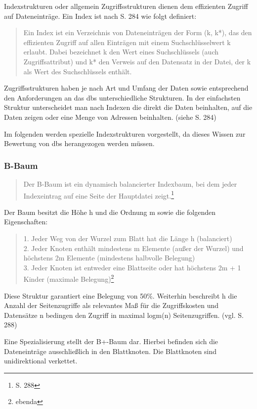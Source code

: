 Indexstrukturen oder allgemein Zugriffsstrukturen dienen dem effizienten Zugriff auf Dateneinträge.
Ein Index ist nach \cite{book:kudrass} S. 284 wie folgt definiert:
\begin{quote}
Ein Index ist ein Verzeichnis von Dateneinträgen der Form (k, k*), das den effizienten Zugriff auf allen Einträgen mit einem Suchschlüsselwert k erlaubt. Dabei bezeichnet k den Wert eines Suchschlüssels (auch Zugriffsattribut) und k* den Verweis auf den Datensatz in der Datei, der k als Wert des Suchschlüssels enthält.
\end{quote}
Zugriffsstrukturen haben je nach Art und Umfang der Daten sowie entsprechend den Anforderungen an das \Gls{dbs} unterschiedliche Strukturen.
In der einfachsten Struktur unterscheidet man nach Indexen die direkt die Daten beinhalten, auf die Daten zeigen oder eine Menge von Adressen beinhalten. (siehe \cite{book:kudrass} S. 284)

Im folgenden werden spezielle Indexstrukturen vorgestellt, da dieses Wissen zur Bewertung von \Gls{dbs} herangezogen werden müssen.

\subsubsection{B-Baum}

\begin{quote}
Der B-Baum ist ein dynamisch balancierter Indexbaum, bei dem jeder Indexeintrag auf eine Seite der Hauptdatei zeigt.\footnote{\cite{book:kudrass} S. 288}
\end{quote}
Der Baum besitzt die Höhe h und die Ordnung m sowie die folgenden Eigenschaften:
\begin{quote}
1. Jeder Weg von der Wurzel zum Blatt hat die Länge h (balanciert)\\
2. Jeder Knoten enthält mindestens m Elemente (außer der Wurzel) und  höchstens 2m Elemente (mindestens halbvolle Belegung)\\
3. Jeder Knoten ist entweder eine Blattseite oder hat höchstens 2m + 1 Kinder (maximale Belegung)\footnote{ebenda}
\end{quote}
Diese Struktur garantiert eine Belegung von 50\%.
Weiterhin beschreibt h die Anzahl der Seitenzugriffe als relevantes Maß für die Zugriffskosten und Datensätze n bedingen den Zugriff in maximal logm(n) Seitenzugriffen. (vgl. \cite{book:kudrass} S. 288)

Eine Spezialisierung stellt der B+-Baum dar.
Hierbei befinden sich die Dateneinträge ausschließlich in den Blattknoten.
Die Blattknoten sind unidirektional verkettet.

